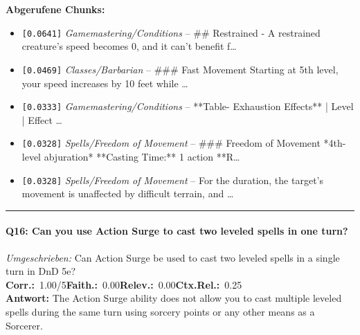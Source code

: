 \noindent\textbf{Abgerufene Chunks:}
\begin{itemize}[noitemsep, topsep=2pt]
  \item[\textbf{\#1}] \texttt{[0.0641]} \textit{Gamemastering/Conditions} -- \#\# Restrained  - A restrained creature's speed becomes 0, and it can't benefit f\ldots
  \item[\textbf{\#2}] \texttt{[0.0469]} \textit{Classes/Barbarian} -- \#\#\# Fast Movement  Starting at 5th level, your speed increases by 10 feet while \ldots
  \item[\textbf{\#3}] \texttt{[0.0333]} \textit{Gamemastering/Conditions} -- **Table- Exhaustion Effects**  | Level | Effect                                 \ldots
  \item[\textbf{\#4}] \texttt{[0.0328]} \textit{Spells/Freedom of Movement} -- \#\#\# Freedom of Movement  *4th-level abjuration*  **Casting Time:** 1 action  **R\ldots
  \item[\textbf{\#5}] \texttt{[0.0328]} \textit{Spells/Freedom of Movement} -- For the duration, the target's movement is unaffected by difficult terrain, and \ldots
\end{itemize}
\vspace{4pt}
\hrule
\vspace{6pt}

\paragraph{Q16: Can you use Action Surge to cast two leveled spells in one turn?}
\textit{Umgeschrieben:} Can Action Surge be used to cast two leveled spells in a single turn in DnD 5e?\\[2pt]
\noindent \textbf{Corr.:}~1.00/5\quad \textbf{Faith.:}~0.00\quad \textbf{Relev.:}~0.00\quad \textbf{Ctx.Rel.:}~0.25\\

\noindent\textbf{Antwort:} The Action Surge ability does not allow you to cast multiple leveled spells during the same turn using sorcery points or any other means as a Sorcerer.

